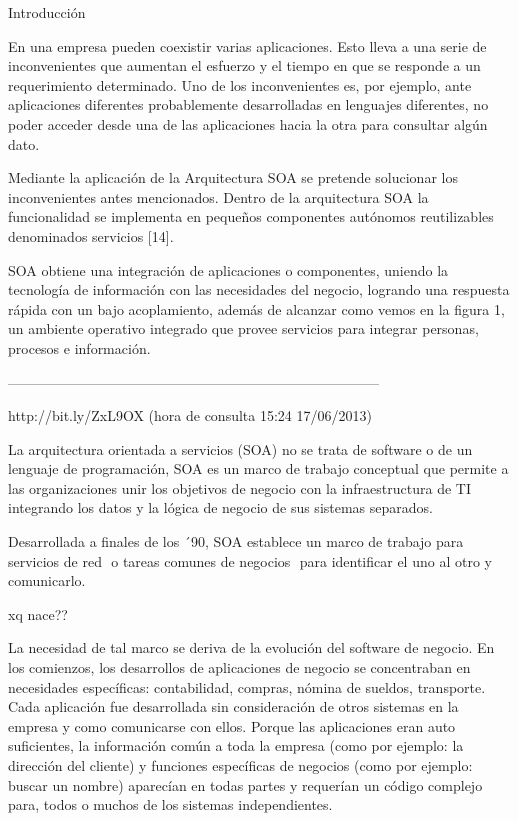 Introducción   

En una empresa pueden coexistir varias aplicaciones. Esto lleva a una serie de inconvenientes que aumentan el esfuerzo y el tiempo en 
que se responde a un requerimiento determinado. Uno de los inconvenientes es, por ejemplo, ante aplicaciones diferentes probablemente 
desarrolladas en lenguajes diferentes, no poder acceder desde una de las aplicaciones hacia la otra para consultar algún dato.

Mediante la aplicación de la Arquitectura SOA se pretende solucionar los inconvenientes antes mencionados. Dentro de la arquitectura 
SOA la funcionalidad se implementa en pequeños componentes autónomos reutilizables denominados servicios [14].

SOA obtiene una integración de aplicaciones o componentes, uniendo la tecnología de información con las necesidades del negocio, 
logrando una respuesta rápida con un bajo acoplamiento, además de alcanzar como vemos en la figura 1, un ambiente operativo integrado 
que provee servicios para integrar personas, procesos e información.

--------------------------------------------------------------------------------

http://bit.ly/ZxL9OX (hora de consulta 15:24 17/06/2013)

La arquitectura orientada a servicios (SOA) no se trata de software o de un lenguaje de programación, SOA es un marco de trabajo 
conceptual que permite a las organizaciones unir los objetivos de negocio con la infraestructura de TI integrando los datos y la 
lógica de negocio de sus sistemas separados.

Desarrollada a finales de los ´90, SOA establece un marco de trabajo para servicios de red  o tareas comunes de negocios  para 
identificar el uno al otro y comunicarlo. 

xq nace??

La necesidad de tal marco se deriva de la evolución del software de negocio. En los comienzos, los desarrollos de aplicaciones 
de negocio se concentraban en necesidades específicas: contabilidad, compras, nómina de sueldos, transporte. Cada aplicación 
fue desarrollada sin consideración de otros sistemas en la empresa y como comunicarse con ellos. Porque las aplicaciones eran 
auto suficientes, la información común a toda la empresa (como por ejemplo: la dirección del cliente) y funciones específicas 
de negocios (como por ejemplo: buscar un nombre) aparecían en todas partes y requerían un código complejo para, todos o muchos 
de los sistemas independientes.

